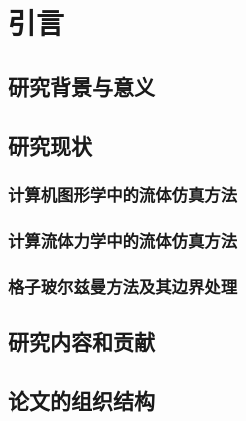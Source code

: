 \chapter{引言}

\section{研究背景与意义}

\section{研究现状}

\subsection{计算机图形学中的流体仿真方法}

\subsection{计算流体力学中的流体仿真方法}

\subsection{格子玻尔兹曼方法及其边界处理}

\section{研究内容和贡献}

\section{论文的组织结构}